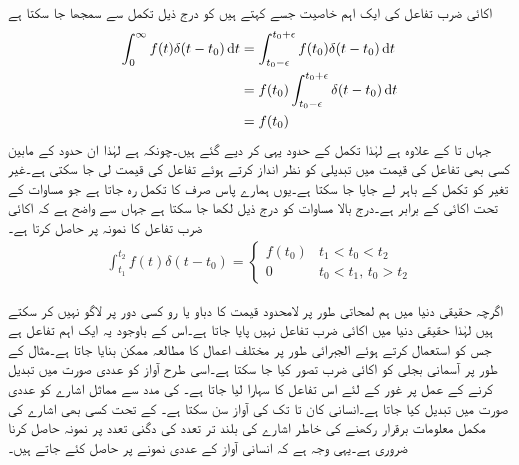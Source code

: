 اکائی ضرب تفاعل کی ایک اہم خاصیت جسے  کہتے ہیں کو درج ذیل تکمل سے سمجھا جا سکتا ہے
\begin{align*}
\int_0^{\infty} f(t) \delta(t-t_0) \dif t&=\int_{t_0-\epsilon}^{t_0+\epsilon} f(t_0) \delta(t-t_0) \dif t\\
&=f(t_0) \int_{t_0-\epsilon}^{t_0+\epsilon} \delta(t-t_0) \dif t\\
&= f(t_0)
\end{align*}
جہاں  تا  کے علاوہ  ہے لہٰذا تکمل کے حدود یہی کر دیے گئے ہیں۔چونکہ  ہے لہٰذا ان حدود کے مابین کسی بھی تفاعل کی قیمت میں تبدیلی کو نظر انداز کرتے ہوئے تفاعل کی قیمت  لی جا سکتی ہے۔غیر تغیر  کو تکمل کے باہر لے جایا جا سکتا ہے۔یوں ہمارے پاس صرف  کا تکمل رہ جاتا ہے جو مساوات  کے تحت اکائی کے برابر ہے۔درج بالا مساوات کو درج ذیل لکھا جا سکتا ہے جہاں سے واضح ہے کہ اکائی ضرب تفاعل  کا نمونہ  پر حاصل کرتا ہے۔
\begin{align}\label{مساوات_لاپلاس_خاصیت_نمونہ_بندی}
\int_{t_1}^{t_2} f(t) \delta(t-t_0)=
\begin{cases}
f(t_0)& t_1<t_0<t_2\\
0&t_0<t_1, \, t_0>t_2 
\end{cases}
\end{align}

اگرچہ حقیقی دنیا میں ہم لمحاتی طور پر لامحدود قیمت کا دباو یا رو کسی دور پر لاگو نہیں کر سکتے  ہیں لہٰذا حقیقی دنیا میں اکائی ضرب تفاعل نہیں پایا جاتا ہے۔اس کے باوجود یہ ایک اہم تفاعل ہے جس کو استعمال کرتے ہوئے الجبرائی طور پر مختلف اعمال کا مطالعہ ممکن بنایا جاتا ہے۔مثال کے طور پر آسمانی بجلی کو اکائی ضرب تصور کیا جا سکتا ہے۔اسی طرح آواز کو عددی صورت میں تبدیل کرنے کے عمل پر غور کے لئے اس تفاعل کا سہارا لیا جاتا ہے۔  کی مدد سے مماثل اشارے کو عددی صورت میں  تبدیل کیا جاتا ہے۔انسانی کان  تا  تک کی آواز سن سکتا ہے۔  کے تحت کسی بھی اشارے کی مکمل معلومات برقرار رکھنے کی خاطر اشارے کی بلند تر تعدد کی دگنی تعدد پر نمونہ حاصل کرنا ضروری ہے۔یہی وجہ ہے کہ انسانی آواز کے عددی نمونے  پر حاصل کئے جاتے ہیں۔

